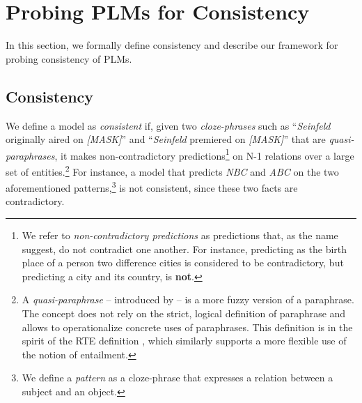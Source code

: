 \section{Probing PLMs for Consistency}
\label{sec:probe}

In this section, we formally define consistency and describe our framework for probing consistency of PLMs.


\subsection{Consistency}
We define a model as \emph{consistent} if, given  two
\textit{cloze-phrases} such as 
 ``\textit{Seinfeld} originally aired on \textit{[MASK]}'' and
``\textit{Seinfeld} premiered on \textit{[MASK]}'' that
are \textit{quasi-paraphrases}, it makes non-contradictory
predictions\footnote{We refer to \textit{non-contradictory
    predictions} as predictions that, as the name suggest,
  do not contradict one another. For instance, predicting as
  the birth place of a person two difference cities is
  considered to be contradictory, but predicting a city and
  its country, is \textbf{not}.}
on N-1 relations over a large set of entities.\footnote{A \textit{quasi-paraphrase} -- introduced by \citet{what_is_paraphrase} -- is a more fuzzy version of a paraphrase. The concept does not rely
  on the strict, logical definition of paraphrase and
  allows to operationalize concrete uses of
  paraphrases. This definition is in the spirit of the RTE
  definition \cite{dagan-rte}, which similarly supports a
  more flexible use of the notion of entailment.}
 For instance, a model that predicts \textit{NBC} and \textit{ABC} on the two aforementioned patterns,\footnote{We define a \textit{pattern} as a cloze-phrase that expresses a relation between a subject and an object.} is not consistent, since these two facts are contradictory.
